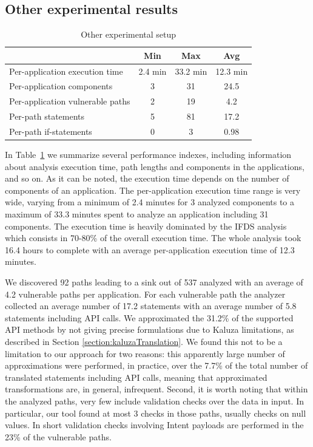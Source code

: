 \subsection{Other experimental results}

\begin{table}[t]
  \centering
  \begin{tabular}{|l|c|c|c|}
    \hline
    & Min & Max & Avg \\ \hline
    Per-application execution time & 2.4 min & 33.2 min & 12.3 min \\
    Per-application components & 3 & 31 & 24.5 \\
    Per-application vulnerable paths & 2 & 19 & 4.2 \\
    Per-path statements & 5 & 81 & 17.2 \\
    Per-path if-statements & 0 & 3 & 0.98 \\
    \hline
  \end{tabular}
  \caption{Other experimental setup}
  \label{table:other_experimental}
\end{table}

In Table~\ref{table:other_experimental} we summarize several performance indexes, including information about analysis execution time, path lengths and components in the applications, and so on. As it can be noted, the execution time depends on the number of components of an application. The per-application
execution time range is very wide, varying from a minimum of 2.4 minutes for 3 analyzed components to a maximum of 33.3 minutes spent to analyze an
application including 31 components. The execution time is heavily dominated by the IFDS analysis which consists in 70-80\% of the overall execution time.
The whole analysis took 16.4 hours to complete with an average per-application execution time of 12.3 minutes.

We discovered 92 paths leading to a sink out of 537 analyzed with an average of 4.2 vulnerable paths per application. For each vulnerable path the analyzer collected an average number of 17.2 statements with an average number of 5.8 statements including API calls. We approximated the 31.2\% of the supported API methods by not giving precise formulations due to Kaluza limitations, as described in Section \ref{section:kaluzaTranslation}. We found this not to be a limitation to our approach for two reasons: this apparently large number of approximations were performed, in practice, over the 7.7\% of the total number of translated statements including API calls, meaning that approximated transformations are, in general, infrequent.
Second, it is worth noting that within the analyzed paths, very few include validation checks over the data in input. In particular, our tool found at most 3 checks in those paths, usually checks on null values. In short validation checks involving Intent payloads are performed in the 23\% of the vulnerable paths.

